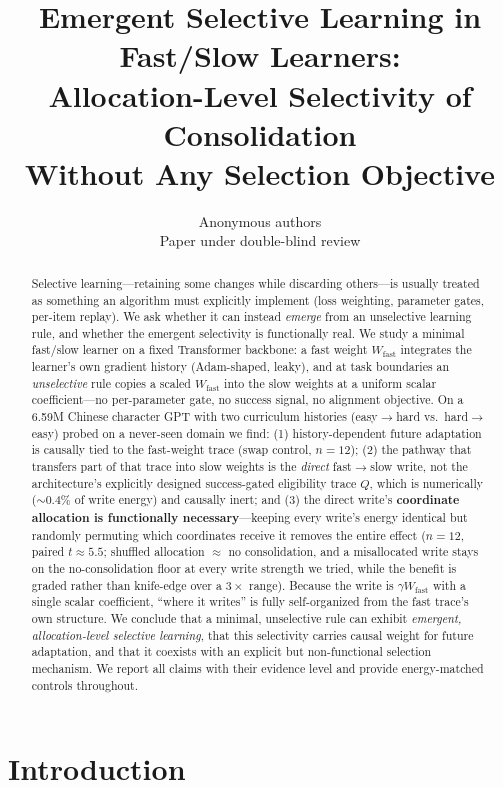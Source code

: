 \documentclass{article} %
\title{Emergent Selective Learning in Fast/Slow Learners:\\
Allocation-Level Selectivity of Consolidation\\ Without Any Selection Objective}
\author{Anonymous authors\\
Paper under double-blind review}
\begin{document}
\maketitle

\begin{abstract}
Selective learning---retaining some changes while discarding others---is usually treated as something an algorithm must explicitly implement (loss weighting, parameter gates, per-item replay). We ask whether it can instead \emph{emerge} from an unselective learning rule, and whether the emergent selectivity is functionally real. We study a minimal fast/slow learner on a fixed Transformer backbone: a fast weight $W_{\mathrm{fast}}$ integrates the learner's own gradient history (Adam-shaped, leaky), and at task boundaries an \emph{unselective} rule copies a scaled $W_{\mathrm{fast}}$ into the slow weights at a uniform scalar coefficient---no per-parameter gate, no success signal, no alignment objective. On a 6.59M Chinese character GPT with two curriculum histories (easy$\to$hard vs.\ hard$\to$easy) probed on a never-seen domain we find: (1) history-dependent future adaptation is causally tied to the fast-weight trace (swap control, $n{=}12$); (2) the pathway that transfers part of that trace into slow weights is the \emph{direct} fast$\to$slow write, not the architecture's explicitly designed success-gated eligibility trace $Q$, which is numerically ($\sim$0.4\% of write energy) and causally inert; and (3) the direct write's \textbf{coordinate allocation is functionally necessary}---keeping every write's energy identical but randomly permuting which coordinates receive it removes the entire effect ($n{=}12$, paired $t\approx5.5$; shuffled allocation $\approx$ no consolidation, and a misallocated write stays on the no-consolidation floor at every write strength we tried, while the benefit is graded rather than knife-edge over a $3\times$ range). Because the write is $\gamma W_{\mathrm{fast}}$ with a single scalar coefficient, ``where it writes'' is fully self-organized from the fast trace's own structure. We conclude that a minimal, unselective rule can exhibit \emph{emergent, allocation-level selective learning}, that this selectivity carries causal weight for future adaptation, and that it coexists with an explicit but non-functional selection mechanism. We report all claims with their evidence level and provide energy-matched controls throughout.
\end{abstract}

\section{Introduction}
\end{document}

